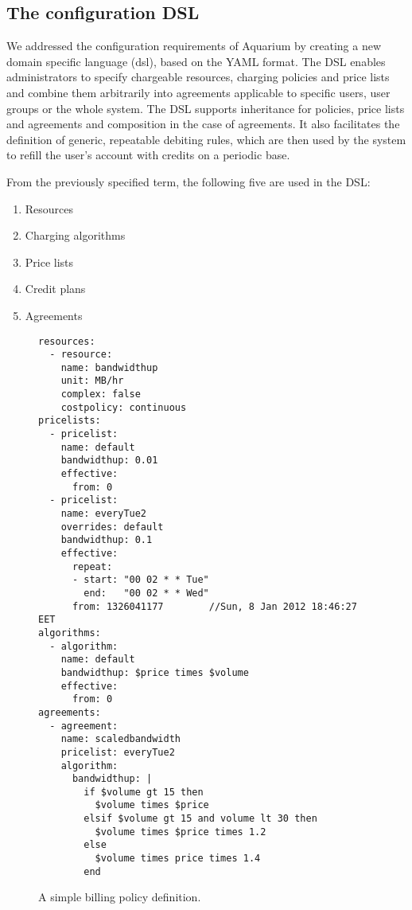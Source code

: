 \documentclass[preprint,10pt]{sigplanconf}
\begin{document}
\subsection{The configuration DSL}
\label{sec:dsl}
We addressed the configuration requirements of Aquarium by creating a new
domain specific language ({\sc dsl}), based on the YAML format.  The DSL
enables administrators to specify chargeable resources, charging policies and
price lists and combine them arbitrarily into agreements applicable to specific
users, user groups or the whole system. 
The DSL supports inheritance for policies, price lists and agreements and composition in the case of agreements.
It also facilitates the
definition of generic, repeatable debiting rules, which are then used by the
system to refill the user's account with credits on a periodic base.

From the previously specified term, the following five are used in the DSL:

\begin{enumerate}
\item Resources
\item Charging algorithms
\item Price lists
\item Credit plans
\item Agreements
\end{enumerate}


\begin{figure}
\lstset{language=c, basicstyle=\footnotesize,
stringstyle=\ttfamily, 
flexiblecolumns=true, aboveskip=-0.9em, belowskip=0em, lineskip=0em}

\begin{lstlisting}
resources:
  - resource:
    name: bandwidthup
    unit: MB/hr
    complex: false
    costpolicy: continuous
pricelists:
  - pricelist: 
    name: default
    bandwidthup: 0.01
    effective:
      from: 0
  - pricelist: 
    name: everyTue2
    overrides: default
    bandwidthup: 0.1
    effective:
      repeat:
      - start: "00 02 * * Tue"
        end:   "00 02 * * Wed"
      from: 1326041177        //Sun, 8 Jan 2012 18:46:27 EET
algorithms:
  - algorithm:
    name: default
    bandwidthup: $price times $volume
    effective:
      from: 0
agreements:
  - agreement:
    name: scaledbandwidth
    pricelist: everyTue2
    algorithm:
      bandwidthup: |
        if $volume gt 15 then
          $volume times $price
        elsif $volume gt 15 and volume lt 30 then
          $volume times $price times 1.2
        else
          $volume times price times 1.4
        end
\end{lstlisting}

\caption{A simple billing policy definition.} 
\label{fig:dsl}
\end{figure}
\end{document}
